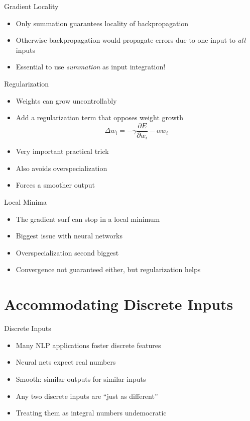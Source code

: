 \documentclass[size=14pt,
  style=tycja,
  paper=screen,
  ]{powerdot}
\begin{document}
\begin{slide}{Gradient Locality}
  \begin{itemize}
  \item Only summation guarantees locality of backpropagation
  \item Otherwise  backpropagation would  propagate errors due  to one
    input to \emph{all} inputs
  \item Essential to use \emph{summation} as input integration!
  \end{itemize}
\end{slide}

\begin{slide}{Regularization}
  \begin{itemize}
  \item Weights can grow uncontrollably
  \item Add a regularization term that opposes weight growth
    \begin{equation}
      \Delta w_i = -\gamma \frac{\partial E}{\partial w_i} - \alpha w_i
    \end{equation}
  \item Very important practical trick
  \item Also avoids overspecialization
  \item Forces a smoother output
  \end{itemize}
\end{slide}

\begin{slide}{Local Minima}
  \begin{itemize}
  \item The gradient surf can stop in a local minimum
  \item Biggest issue with neural networks
  \item Overspecialization second biggest
  \item Convergence not guaranteed either, but regularization helps
  \end{itemize}
\end{slide}

\section{Accommodating Discrete Inputs}

\begin{slide}{Discrete Inputs}
  \begin{itemize}
  \item Many NLP applications foster discrete features
  \item Neural nets expect real numbers
  \item Smooth: similar outputs for similar inputs
  \item Any two discrete inputs are ``just as different''
  \item Treating them as integral numbers undemocratic
  \end{itemize}
\end{slide}
\end{document}
